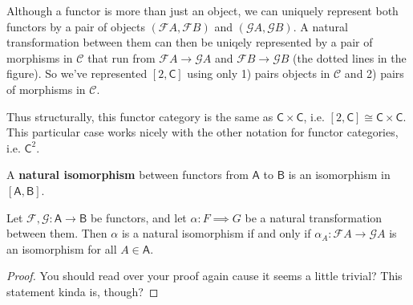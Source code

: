 \documentclass[10pt]{report}
\newcommand{\cat}[1]{\mathsf{#1}}
\begin{document}
Although a functor is more than just an object, we can uniquely represent both functors by a pair of objects $(\mathcal{F}A, \mathcal{F}B)$ and $(\mathcal{G}A, \mathcal{G}B)$. A natural transformation between them can then be uniqely represented by a pair of morphisms in $\mathcal{C}$ that run from $\mathcal{F}A\to \mathcal{G}A$ and $\mathcal{F}B\to \mathcal{G}B$ (the dotted lines in the figure). So we've represented $[2, \cat{C}]$ using only 1) pairs objects in $\mathcal{C}$ and 2) pairs of morphisms in $\mathcal{C}$.

Thus structurally, this functor category is the same as $\cat{C} \times \cat{C}$, i.e. $[2, \cat{C}] \cong \cat{C} \times \cat{C}$. This particular case works nicely with the other notation for functor categories, i.e. $\cat{C}^2$.

\begin{defn}
	A \textbf{natural isomorphism} between functors from $\cat{A}$ to $\cat{B}$ is an isomorphism in $[\cat{A},\cat{B}].$
\end{defn}

\begin{prop}
Let $\mathcal{F},\mathcal{G}:\cat{A}\to \cat{B}$ be functors, and let $\alpha:F\implies G$ be a natural transformation between them. Then $\alpha$ is a natural isomorphism if and only if $\alpha_A:\mathcal{F}A\to \mathcal{G}A$ is an isomorphism for all $A \in \cat{A}$.
\end{prop}
\begin{proof}
{\color{red}You should read over your proof again cause it seems a little trivial? This statement kinda is, though?}
\end{proof}
\end{document}

